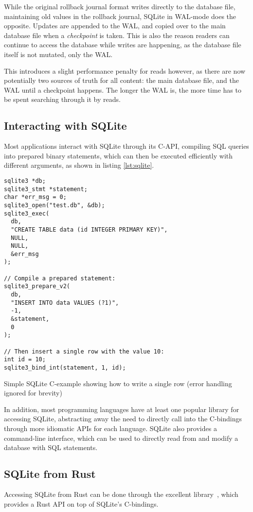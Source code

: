While the original rollback journal format writes directly to the database file,
maintaining old values in the rollback journal, SQLite in WAL-mode does the
opposite. Updates are appended to the WAL, and copied over to the main database
file when a \textit{checkpoint} is taken. This is also the reason readers can
continue to access the database while writes are happening, as the database file
itself is not mutated, only the WAL.\@

This introduces a slight performance penalty for reads however, as there are now
potentially two sources of truth for all content: the main database file, and
the WAL until a checkpoint happens. The longer the WAL is, the more time has to
be spent searching through it by reads.

\subsection{Interacting with SQLite}
Most applications interact with SQLite through its C-API, compiling SQL
queries into prepared binary statements, which can then be executed efficiently
with different arguments, as shown in listing \ref{lst:sqlite}.

\begin{listing}[H]
  \begin{verbatim}
sqlite3 *db;
sqlite3_stmt *statement;
char *err_msg = 0;
sqlite3_open("test.db", &db);
sqlite3_exec(
  db,
  "CREATE TABLE data (id INTEGER PRIMARY KEY)",
  NULL,
  NULL,
  &err_msg
);

// Compile a prepared statement:
sqlite3_prepare_v2(
  db,
  "INSERT INTO data VALUES (?1)",
  -1,
  &statement,
  0
);

// Then insert a single row with the value 10:
int id = 10;
sqlite3_bind_int(statement, 1, id);
  \end{verbatim}

  \caption{Simple SQLite C-example showing how to write a single row (error
  handling ignored for brevity)}\label{lst:sqlite}
\end{listing}

In addition, most programming languages have at least one popular library for
accessing SQLite, abstracting away the need to directly call into the C-bindings
through more idiomatic APIs for each language. SQLite also provides a
command-line interface, which can be used to directly read from and modify a
database with SQL statements.

\subsection{SQLite from Rust}
Accessing SQLite from Rust can be done through the excellent 
library~\cite{rusqlite}, which
provides a Rust API on top of SQLite's C-bindings.


